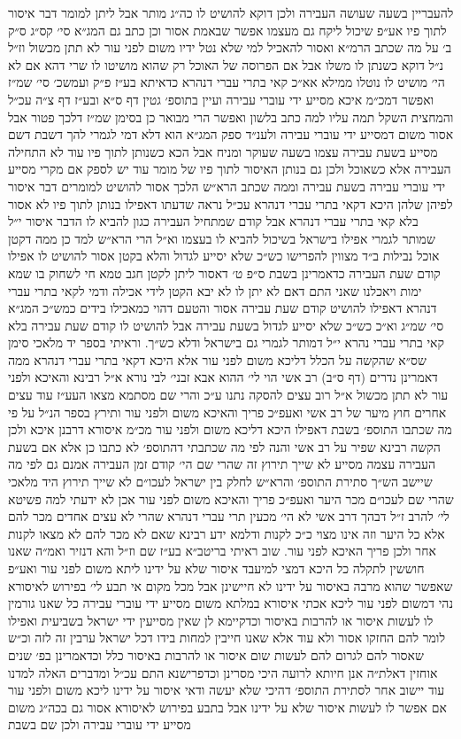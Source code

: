 \documentclass[12pt, openany]{book}
\begin{document}
\begin{multicols}{2}
להעבריין בשעה שעושה העבירה ולכן דוקא להושיט לו כה״ג מותר אבל ליתן למומר דבר איסור לתוך פיו אע״פ שיכול ליקח גם מעצמו אפשר שבאמת אסור וכן כתב גם המג״א סי׳ קס״ג ס״ק ב׳ על מה שכתב הרמ״א ואסור להאכיל למי שלא נטל ידיו משום לפני עור לא תתן מכשול וז״ל נ״ל דוקא כשנתן לו משלו אבל אם הפרוסה של האוכל רק שהוא מושיטו לו שרי דהא אם לא הי׳ מושיט לו נוטלו ממילא אא״כ קאי בתרי עברי דנהרא כדאיתא בע״ז פ״ק ועמשכ׳ סי׳ שמ״ז ואפשר דמכ״מ איכא מסייע ידי עוברי עבירה ועיין בתוספ׳ גטין דף ס״א ובע״ז דף צ״ה עכ״ל והמחצית השקל תמה עליו למה כתב בלשון ואפשר הרי מבואר כן בסימן שמ״ז דלכך פטור אבל אסור משום דמסייע ידי עוברי עבירה ולענ״ד ספק המג״א הוא דלא דמי לגמרי להך דשבת דשם מסייע בשעת עבירה עצמו בשעה שעוקר ומניח אבל הכא כשנותן לתוך פיו עוד לא התחילה העבירה אלא כשאוכל ולכן גם בנותן האיסור לתוך פיו של מומר עוד יש לספק אם מקרי מסייע ידי עוברי עבירה בשעת עבירה וממה שכתב הרא״ש הלכך אסור להושיט למומרים דבר איסור לפיהן שלהן היכא דקאי בתרי עברי דנהרא עכ״ל נראה שדעתו דאפילו בנותן לתוך פיו לא אסור בלא קאי בתרי עברי דנהרא אבל קודם שמתחיל העבירה כגון להביא לו הדבר איסור י״ל שמותר לגמרי אפילו בישראל בשיכול להביא לו בעצמו וא״ל הרי הרא״ש למד כן ממה דקטן אוכל נבילות ב״ד מצווין להפרישו כש״כ שלא יסייע לגדול והלא בקטן אסור להושיט לו אפילו קודם שעת העבירה כדאמרינן בשבת ס״פ ט׳ דאסור ליתן לקטן חגב טמא חי לשחוק בו שמא ימות ויאכלנו שאני התם דאם לא יתן לו לא יבא הקטן לידי אכילה ודמי לקאי בתרי עברי דנהרא דאפילו להושיט קודם שעת עבירה אסור והטעם דהוי כמאכילו בידים כמש״כ המג״א סי׳ שמ״ג וא״כ כש״כ שלא יסייע לגדול בשעת עבירה אבל להושיט לו קודם שעת עבירה בלא קאי בתרי עברי נהרא י״ל דמותר לגמרי גם בישראל ודלא כש״ך. וראיתי בספר יד מלאכי סימן שס״א שהקשה על הכלל דליכא משום לפני עור אלא היכא דקאי בתרי עברי דנהרא ממה דאמרינן נדרים (דף ס״ב) רב אשי הוי לי׳ ההוא אבא זבני׳ לבי נורא א״ל רבינא והאיכא ולפני עור לא תתן מכשול א״ל רוב עצים להסקה נתנו ע״כ והרי שם מסתמא מצאו העע״ז עוד עצים אחרים חוץ מיער של רב אשי ואעפ״כ פריך והאיכא משום ולפני עור ותירץ בספר הנ״ל על פי מה שכתבו התוספ׳ בשבת דאפילו היכא דליכא משום ולפני עור מכ״מ איסורא דרבנן איכא ולכן הקשה רבינא שפיר על רב אשי והנה לפי מה שכתבתי דהתוספ׳ לא כתבו כן אלא אם בשעת העבירה עצמה מסייע לא שייך תירוץ זה שהרי שם הי׳ קודם זמן העבירה אמנם גם לפי מה שיישב הש״ך סתירת התוספ׳ והרא״ש לחלק בין ישראל לעכו״ם לא שייך תירוץ היד מלאכי שהרי שם לעכו״ם מכר היער ואעפ״כ פריך והאיכא משום לפני עור אכן לא ידעתי למה פשיטא לי׳ להרב ז״ל דבהך דרב אשי לא הי׳ מכעין תרי עברי דנהרא שהרי לא עצים אחדים מכר להם אלא כל היער וזה אינו מצוי כ״כ לקנות ודלמא ידע רבינא שאם לא מכר להם לא מצאו לקנות אחר ולכן פריך האיכא לפני עור. שוב ראיתי בריטב״א בע״ז שם וז״ל והא דנזיר ואמ״ה שאנו חוששין לתקלה כל היכא דמצי למיעבד איסור שלא על ידינו ליתא משום לפני עור ואע״פ שאפשר שהוא מרבה באיסור על ידינו לא חיישינן אבל מכל מקום אי תבע לי׳ בפירוש לאיסורא נהי דמשום לפני עור ליכא אכתי איסורא במלתא משום מסייע ידי עוברי עבירה כל שאנו גורמין לו לעשות איסור או להרבות באיסור וכדקיימא לן שאין מסייעין ידי ישראל בשביעית ואפילו לומר להם החזקו אסור ולא עוד אלא שאנו חייבין למחות בידו דכל ישראל ערבין זה לזה וכ״ש שאסור להם לגרום להם לעשות שום איסור או להרבות באיסור כלל וכדאמרינן בפ׳ שנים אוחזין דאלת״ה אנן חיותא לרועה היכי מסרינן וכדפרישנא התם עכ״ל ומדברים האלה למדנו עוד יישוב אחר לסתירת התוספ׳ דהיכי שלא יעשה ודאי איסור על ידינו ליכא משום ולפני עור אם אפשר לו לעשות איסור שלא על ידינו אבל בתבע בפירוש לאיסורא אסור גם בכה״ג משום מסייע ידי עוברי עבירה ולכן שם בשבת 
\end{multicols}
\end{document}
